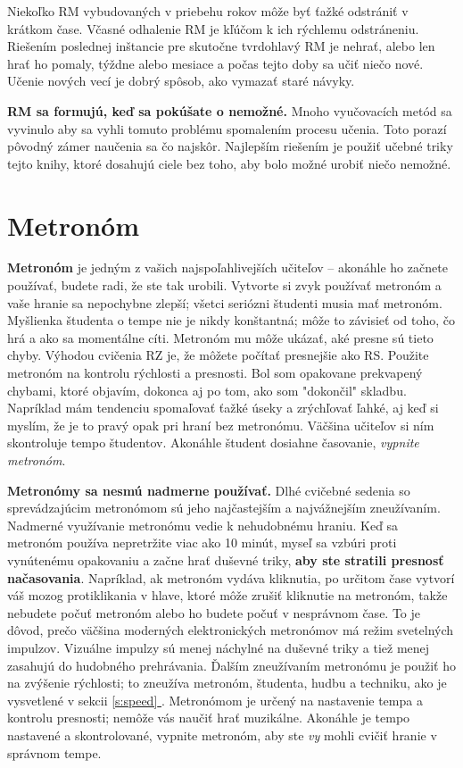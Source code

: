 \documentclass[11pt,a4paper]{book}
\newcommand*{\fullref}[1]{\hyperref[{#1}]{\ref*{#1} \nameref*{#1}}} %
\begin{document}
Niekoľko RM vybudovaných v priebehu rokov môže byť ťažké odstrániť v krátkom čase. Včasné odhalenie RM je kľúčom k ich rýchlemu odstráneniu. Riešením poslednej inštancie pre skutočne tvrdohlavý RM je nehrať, alebo len hrať ho pomaly, týždne alebo mesiace a počas tejto doby sa učiť niečo nové. Učenie nových vecí je dobrý spôsob, ako vymazať staré návyky.

\textbf{RM sa formujú, keď sa pokúšate o nemožné.} Mnoho vyučovacích metód sa vyvinulo aby sa vyhli tomuto problému spomalením procesu učenia. Toto porazí pôvodný zámer naučenia sa čo najskôr. Najlepším riešením je použiť učebné triky tejto knihy, ktoré dosahujú ciele bez toho, aby bolo možné urobiť niečo nemožné.

\section{Metronóm}\label{s:metronome}
\textbf{Metronóm} je jedným z vašich najspoľahlivejších učiteľov -- akonáhle ho začnete používať, budete radi, že ste tak urobili. Vytvorte si zvyk používať metronóm a vaše hranie sa nepochybne zlepší; všetci seriózni študenti musia mať metronóm. Myšlienka študenta o tempe nie je nikdy konštantná; môže to závisieť od toho, čo hrá a ako sa momentálne cíti. Metronóm mu môže ukázať, aké presne sú tieto chyby. Výhodou cvičenia RZ je, že môžete počítať presnejšie ako RS. Použite metronóm na kontrolu rýchlosti a presnosti. Bol som opakovane prekvapený chybami, ktoré objavím, dokonca aj po tom, ako som "dokončil" skladbu. Napríklad mám tendenciu spomaľovať ťažké úseky a zrýchľovať ľahké, aj keď si myslím, že je to pravý opak pri hraní bez metronómu. Väčšina učiteľov si ním skontroluje tempo študentov. Akonáhle študent dosiahne časovanie, \emph{vypnite metronóm}.

\textbf{Metronómy sa nesmú nadmerne používať.} Dlhé cvičebné sedenia so sprevádzajúcim metronómom sú jeho najčastejším a najvážnejším zneužívaním. Nadmerné využívanie metronómu vedie k nehudobnému hraniu. Keď sa metronóm používa nepretržite viac ako 10 minút, myseľ sa vzbúri proti vynútenému opakovaniu a začne hrať duševné triky, \textbf{aby ste stratili presnosť načasovania}. Napríklad, ak metronóm vydáva kliknutia, po určitom čase vytvorí váš mozog protiklikania v hlave, ktoré môže zrušiť kliknutie na metronóm, takže nebudete počuť metronóm alebo ho budete počuť v nesprávnom čase. To je dôvod, prečo väčšina moderných elektronických metronómov má režim svetelných impulzov. Vizuálne impulzy sú menej náchylné na duševné triky a tiež menej zasahujú do hudobného prehrávania. Ďalším zneužívaním metronómu je použiť ho na zvýšenie rýchlosti; to zneužíva metronóm, študenta, hudbu a techniku, ako je vysvetlené v sekcii \fullref{s:speed}. Metronómom je určený na nastavenie tempa a kontrolu presnosti; nemôže vás naučiť hrať muzikálne. Akonáhle je tempo nastavené a skontrolované, vypnite metronóm, aby ste \emph{vy} mohli cvičiť hranie v správnom tempe.
\end{document}
